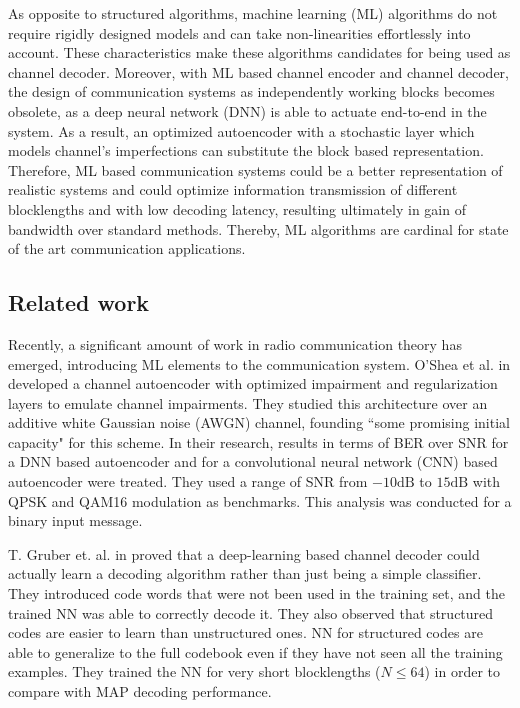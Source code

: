 \documentclass[conference]{IEEEtran}
\begin{document}
As opposite to structured algorithms, machine learning (ML) algorithms do not require rigidly designed models and can take non-linearities effortlessly into account. These characteristics make these algorithms candidates for being used as channel decoder. Moreover, with ML based channel encoder and channel decoder, the design of communication systems as independently working blocks becomes obsolete, as a deep neural network (DNN) is able to actuate end-to-end in the system. As a result, an optimized autoencoder with a stochastic layer which models channel's imperfections can substitute the block based representation. Therefore, ML based communication systems could be a better representation of realistic systems and could optimize information transmission of different blocklengths and with low decoding latency, resulting ultimately in gain of bandwidth over standard methods. Thereby, ML algorithms are cardinal for state of the art communication applications. 

\subsection{Related work}

Recently, a significant amount of work in radio communication theory has emerged, introducing ML elements to the communication system. O'Shea et al. in \cite{2016arXiv160806409O} developed a channel autoencoder with optimized impairment and regularization layers to emulate channel impairments. They studied this architecture over an additive white Gaussian noise (AWGN) channel, founding ``some promising initial capacity" for this scheme. In their research, results in terms of BER over SNR for a DNN based autoencoder and for a convolutional neural network (CNN) based autoencoder were treated. They used a range of SNR from $-10 \text{dB}$ to $15 \text{dB}$ with QPSK and QAM16 modulation as benchmarks. This analysis was conducted for a binary input message.

    
T. Gruber et. al. in \cite{2017arXiv171008379G} proved that a deep-learning based channel decoder could actually learn a decoding algorithm rather than just being a simple classifier. They introduced code words that were not been used in the training set, and the trained NN was able to correctly decode it. They also observed that structured codes are easier to learn than unstructured ones. NN for structured codes are able to generalize to the full codebook even if they have not seen all the training examples. They trained the NN for very short blocklengths ($N \leq 64$) in order to compare with MAP decoding performance.
\end{document}

